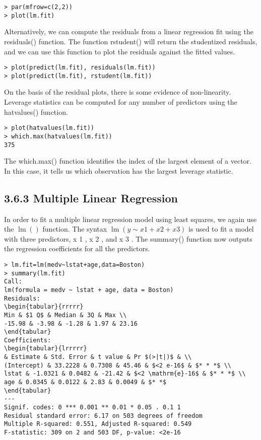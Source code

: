 \documentclass[10pt]{article}
\begin{document}
\begin{verbatim}
> par(mfrow=c(2,2))
> plot(lm.fit)
\end{verbatim}

Alternatively, we can compute the residuals from a linear regression fit using the residuals() function. The function rstudent() will return the studentized residuals, and we can use this function to plot the residuals against the fitted values.


\begin{verbatim}
> plot(predict(lm.fit), residuals(lm.fit))
> plot(predict(lm.fit), rstudent(lm.fit))
\end{verbatim}

On the basis of the residual plots, there is some evidence of non-linearity. Leverage statistics can be computed for any number of predictors using the hatvalues() function.

\begin{verbatim}
> plot(hatvalues(lm.fit))
> which.max(hatvalues(lm.fit))
375
\end{verbatim}

The which.max() function identifies the index of the largest element of a vector. In this case, it tells us which observation has the largest leverage statistic.

\subsection*{3.6.3 Multiple Linear Regression}
In order to fit a multiple linear regression model using least squares, we again use the $\operatorname{lm}()$ function. The syntax $\operatorname{lm}(y \sim x 1+x 2+x 3)$ is used to fit a model with three predictors, x 1 , x 2 , and x 3 . The summary() function now outputs the regression coefficients for all the predictors.

\begin{verbatim}
> lm.fit=lm(medv~lstat+age,data=Boston)
> summary(lm.fit)
Call:
lm(formula = medv ~ lstat + age, data = Boston)
Residuals:
\begin{tabular}{rrrrr} 
Min & $1 Q$ & Median & 3Q & Max \\
-15.98 & -3.98 & -1.28 & 1.97 & 23.16
\end{tabular}
Coefficients:
\begin{tabular}{lrrrrr} 
& Estimate & Std. Error & t value & Pr $(>|t|)$ & \\
(Intercept) & 33.2228 & 0.7308 & 45.46 & $<2 e-16$ & $* * *$ \\
lstat & -1.0321 & 0.0482 & -21.42 & $<2 \mathrm{e}-16$ & $* * *$ \\
age & 0.0345 & 0.0122 & 2.83 & 0.0049 & $* *$
\end{tabular}
---
Signif. codes: 0 *** 0.001 ** 0.01 * 0.05 . 0.1 1
Residual standard error: 6.17 on 503 degrees of freedom
Multiple R-squared: 0.551, Adjusted R-squared: 0.549
F-statistic: 309 on 2 and 503 DF, p-value: <2e-16
\end{verbatim}
\end{document}
